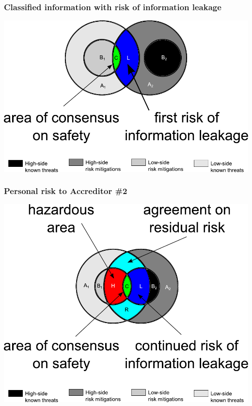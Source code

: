 \documentclass{beamer}
\begin{document}
\begin{frame}
	\frametitle{Classified information with risk of information leakage}
	\begin{center}
		\includegraphics[width=\textwidth]{venn_diagrams_for_slides_4.pdf}
	\end{center}
\end{frame}

\begin{frame}
	\frametitle{Personal risk to Accreditor \#2}
	\begin{center}
		\includegraphics[width=\textwidth]{venn_diagrams_for_slides_5.pdf}
	\end{center}
\end{frame}
\end{document}
